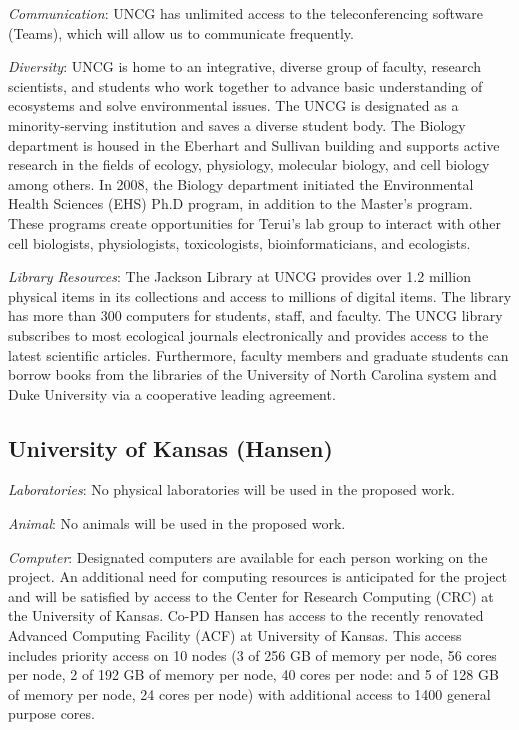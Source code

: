\documentclass[12pt, class=article, crop=false]{standalone}
\begin{document}
\textit{Communication}: UNCG has unlimited access to the teleconferencing software (Teams), which will allow us to communicate frequently.

\textit{Diversity}: UNCG is home to an integrative, diverse group of faculty, research scientists, and students who work together to advance basic understanding of ecosystems and solve environmental issues. The UNCG is designated as a minority-serving institution and saves a diverse student body.
The Biology department is housed in the Eberhart and Sullivan building
and supports active research in the fields of ecology, physiology, molecular biology, and cell biology among others.
In 2008, the Biology department initiated the Environmental Health Sciences (EHS) Ph.D program, in addition to the Master's program.
These programs create opportunities for Terui's lab group to interact with other cell biologists, physiologists, toxicologists, bioinformaticians, and ecologists.

\textit{Library Resources}: The Jackson Library at UNCG provides over 1.2 million physical items in its collections and access to millions of digital items. The library has more than 300 computers for students, staff, and faculty. The UNCG library subscribes to most ecological journals electronically and provides access to the latest scientific articles.
Furthermore, faculty members and graduate students can borrow books from the libraries of the University of North Carolina system and Duke University via a cooperative leading agreement.

\subsection*{University of Kansas (Hansen)}
\textit{Laboratories}: No physical laboratories will be used in the proposed work.

\textit{Animal}: No animals will be used in the proposed work.

\textit{Computer}: Designated computers are available for each person working on the project.
An additional need for computing resources is anticipated for the project and will be satisfied by access to the Center for Research Computing (CRC) at the University of Kansas. 
Co-PD Hansen has access to the recently renovated Advanced Computing Facility (ACF) at University of Kansas.
This access includes priority access on 10 nodes (3 of 256 GB of memory per node, 56 cores per node, 2 of 192 GB of memory per node, 40 cores per node: and 5 of 128 GB of memory per node, 24 cores per node) with additional access to 1400 general purpose cores. 
\end{document}
